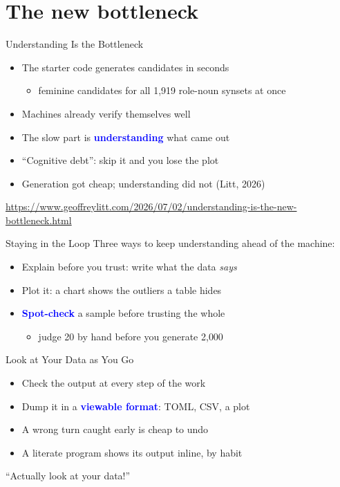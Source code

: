 \documentclass[xetex,aspectratio=169]{beamer}
\newcommand{\txx}[1]{\textbf{\textcolor{blue}{#1}}}
\begin{document}
\section{The new bottleneck}

\begin{frame}{Understanding Is the Bottleneck}
  \begin{itemize}
  \item The starter code generates candidates in seconds
    \begin{itemize}
    \item feminine candidates for all 1{,}919 role-noun synsets at once
    \end{itemize}
  \item Machines already verify themselves well
  \item The slow part is \txx{understanding} what came out
  \item ``Cognitive debt'': skip it and you lose the plot
  \item Generation got cheap; understanding did not (Litt, 2026)
  \end{itemize}
  \vfill
  \scriptsize \url{https://www.geoffreylitt.com/2026/07/02/understanding-is-the-new-bottleneck.html}
\end{frame}

\begin{frame}{Staying in the Loop}
  Three ways to keep understanding ahead of the machine:
  \begin{itemize}
  \item Explain before you trust: write what the data \textit{says}
  \item Plot it: a chart shows the outliers a table hides
  \item \txx{Spot-check} a sample before trusting the whole
    \begin{itemize}
    \item judge 20 by hand before you generate 2{,}000
    \end{itemize}
  \end{itemize}
\end{frame}

\begin{frame}{Look at Your Data as You Go}
  \begin{itemize}
  \item Check the output at every step of the work
  \item Dump it in a \txx{viewable format}: TOML, CSV, a plot
  \item A wrong turn caught early is cheap to undo
  \item A literate program shows its output inline, by habit
  \end{itemize}
  \vfill
  \centering\small ``Actually look at your data!''
\end{frame}
\end{document}
